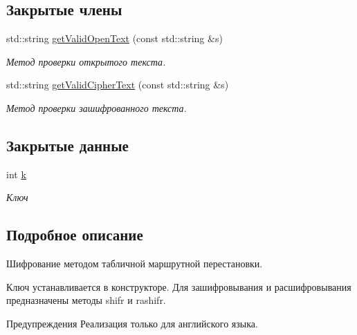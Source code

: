 \subsection*{Закрытые члены}
\begin{DoxyCompactItemize}
\item 
std\+::string \hyperlink{classPerestanovka_a94bea2b10ae0897d6455ae6fd85994e7}{get\+Valid\+Open\+Text} (const std\+::string \&s)\hypertarget{classPerestanovka_a94bea2b10ae0897d6455ae6fd85994e7}{}\label{classPerestanovka_a94bea2b10ae0897d6455ae6fd85994e7}

\begin{DoxyCompactList}\small\item\em Метод проверки открытого текста. \end{DoxyCompactList}\item 
std\+::string \hyperlink{classPerestanovka_a990a3d3603a13242b16c2ba829405788}{get\+Valid\+Cipher\+Text} (const std\+::string \&s)\hypertarget{classPerestanovka_a990a3d3603a13242b16c2ba829405788}{}\label{classPerestanovka_a990a3d3603a13242b16c2ba829405788}

\begin{DoxyCompactList}\small\item\em Метод проверки зашифрованного текста. \end{DoxyCompactList}\end{DoxyCompactItemize}
\subsection*{Закрытые данные}
\begin{DoxyCompactItemize}
\item 
int \hyperlink{classPerestanovka_a7bd5d0e646ddcc4436dc058f505916c1}{k}\hypertarget{classPerestanovka_a7bd5d0e646ddcc4436dc058f505916c1}{}\label{classPerestanovka_a7bd5d0e646ddcc4436dc058f505916c1}

\begin{DoxyCompactList}\small\item\em Ключ \end{DoxyCompactList}\end{DoxyCompactItemize}


\subsection{Подробное описание}
Шифрование методом табличной маршрутной перестановки. 

Ключ устанавливается в конструкторе. Для зашифровывания и расшифровывания предназначены методы shifr и rashifr. \begin{DoxyWarning}{Предупреждения}
Реализация только для английского языка. 
\end{DoxyWarning}


